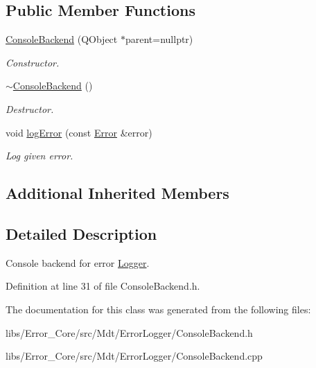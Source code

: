 \subsection*{Public Member Functions}
\begin{DoxyCompactItemize}
\item 
\hyperlink{class_mdt_1_1_error_logger_1_1_console_backend_a79446af5d7658fba5075131f2a0b10dd}{Console\+Backend} (Q\+Object $\ast$parent=nullptr)\hypertarget{class_mdt_1_1_error_logger_1_1_console_backend_a79446af5d7658fba5075131f2a0b10dd}{}\label{class_mdt_1_1_error_logger_1_1_console_backend_a79446af5d7658fba5075131f2a0b10dd}

\begin{DoxyCompactList}\small\item\em Constructor. \end{DoxyCompactList}\item 
\hyperlink{class_mdt_1_1_error_logger_1_1_console_backend_a7ac5878daa1e4204884d62c592de0e57}{$\sim$\+Console\+Backend} ()\hypertarget{class_mdt_1_1_error_logger_1_1_console_backend_a7ac5878daa1e4204884d62c592de0e57}{}\label{class_mdt_1_1_error_logger_1_1_console_backend_a7ac5878daa1e4204884d62c592de0e57}

\begin{DoxyCompactList}\small\item\em Destructor. \end{DoxyCompactList}\item 
void \hyperlink{class_mdt_1_1_error_logger_1_1_console_backend_a2d30700dd6a91c244d68bd3670fdbc33}{log\+Error} (const \hyperlink{class_mdt_1_1_error}{Error} \&error)\hypertarget{class_mdt_1_1_error_logger_1_1_console_backend_a2d30700dd6a91c244d68bd3670fdbc33}{}\label{class_mdt_1_1_error_logger_1_1_console_backend_a2d30700dd6a91c244d68bd3670fdbc33}

\begin{DoxyCompactList}\small\item\em Log given error. \end{DoxyCompactList}\end{DoxyCompactItemize}
\subsection*{Additional Inherited Members}


\subsection{Detailed Description}
Console backend for error \hyperlink{class_mdt_1_1_error_logger_1_1_logger}{Logger}. 

Definition at line 31 of file Console\+Backend.\+h.



The documentation for this class was generated from the following files\+:\begin{DoxyCompactItemize}
\item 
libs/\+Error\+\_\+\+Core/src/\+Mdt/\+Error\+Logger/Console\+Backend.\+h\item 
libs/\+Error\+\_\+\+Core/src/\+Mdt/\+Error\+Logger/Console\+Backend.\+cpp\end{DoxyCompactItemize}
